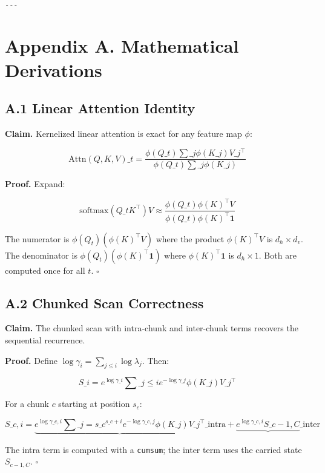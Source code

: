 \begin{lstlisting}

---
\end{lstlisting}


\section{Appendix A. Mathematical Derivations}

\subsection{A.1 Linear Attention Identity}

\textbf{Claim.} Kernelized linear attention is exact for any feature map $\phi$:

\[
\text{Attn}(Q, K, V)\_t = \frac{\phi(Q\_t) \sum\_j \phi(K\_j) V\_j^\top}{\phi(Q\_t) \sum\_j \phi(K\_j)}
\tag{A.1}
\]

\textbf{Proof.} Expand:

\[
\text{softmax}(Q\_t K^\top) V \approx \frac{\phi(Q\_t) \phi(K)^\top V}{\phi(Q\_t) \phi(K)^\top \mathbf{1}}
\]

The numerator is $\phi(Q_t) (\phi(K)^\top V)$ where the product 
$\phi(K)^\top V$ is $d_h \times d_v$. The denominator is 
$\phi(Q_t) (\phi(K)^\top \mathbf{1})$ where $\phi(K)^\top \mathbf{1}$ is 
$d_h \times 1$. Both are computed once for all $t$. $\square$

\subsection{A.2 Chunked Scan Correctness}

\textbf{Claim.} The chunked scan with intra-chunk and inter-chunk terms 
recovers the sequential recurrence.

\textbf{Proof.} Define $\log \gamma_i = \sum_{j \leq i} \log \lambda_j$. Then:

\[
S\_i = e^{\log \gamma\_i} \sum\_{j \leq i} e^{-\log \gamma\_j} \phi(K\_j) V\_j^\top
\tag{A.2}
\]

For a chunk $c$ starting at position $s_c$:

\[
S\_{c, i} = \underbrace{e^{\log \gamma\_{c, i}} \sum\_{j=s\_c}^{s\_c+i} e^{-\log \gamma\_{c, j}} \phi(K\_j) V\_j^\top}\_{\text{intra}} + \underbrace{e^{\log \gamma\_{c, i}} S\_{c-1, C}}\_{\text{inter}}
\tag{A.3}
\]

The intra term is computed with a \texttt{cumsum}; the inter term uses the 
carried state $S_{c-1, C}$. $\square$

